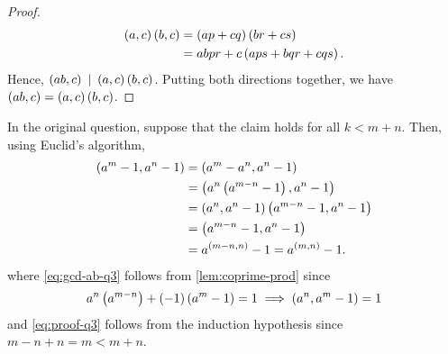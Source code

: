 \documentclass[journal,12pt,onecolumn]{IEEEtran}
\begin{document}
\begin{enumerate}
\begin{proof}
\begin{align}
            \left(a,c\right)\left(b,c\right) &= \left(ap + cq\right)\left(br + cs\right) \\
            &= abpr + c\left(aps + bqr + cqs\right).
        \end{align}
        Hence, \(\brak{ab,c}\ |\ \brak{a,c}\brak{b,c}\). Putting both directions
        together, we have \(\left(ab,c\right) = \left(a,c\right)\left(b,c\right)\).
    \end{proof}
    In the original question, suppose that the claim holds for all \(k < m +
    n\). Then, using Euclid's algorithm,
    \begin{align}
        \left(a^m-1, a^n-1\right) &= \left(a^m-a^n, a^n-1\right) \\
        &= \left(a^n\left(a^{m-n}-1\right), a^n-1\right) \\
        &= \left(a^n, a^n-1\right)\left(a^{m-n}-1, a^n-1\right) \label{eq:gcd-ab-q3} \\
        &= \left(a^{m-n}-1, a^n-1\right) \\
        &= a^{\left(m-n,n\right)} - 1 = a^{\left(m,n\right)} - 1.
        \label{eq:proof-q3}
    \end{align}
    where \eqref{eq:gcd-ab-q3} follows from \autoref{lem:coprime-prod} since
    \begin{align}
        a^n\left(a^{m-n}\right) + \left(-1\right)\left(a^{m} - 1\right) = 1 \implies \left(a^n, a^m - 1\right) = 1
        \label{eq:bezout-ab-q3}
    \end{align}
    and \eqref{eq:proof-q3} follows from the induction hypothesis since \(m-n +
    n = m < m + n\).


\end{enumerate}
\end{document}
